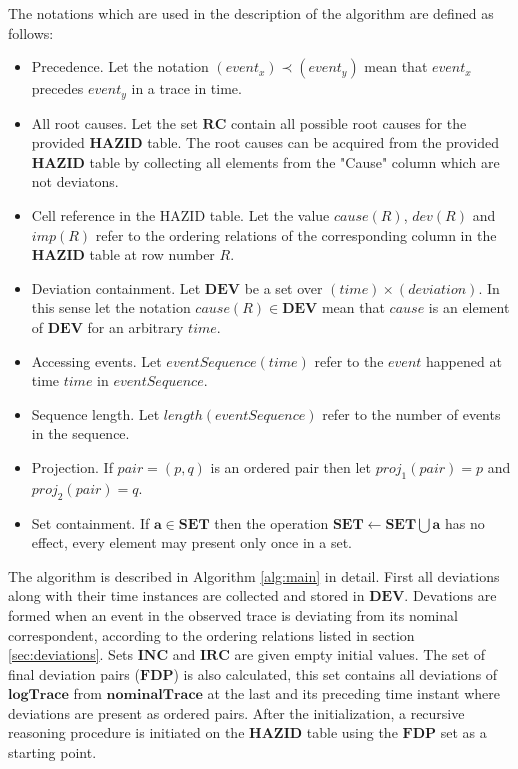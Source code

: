 \documentclass[conference]{IEEEtran}
\begin{document}
The notations which are used in the description of the algorithm are defined as follows:

\begin{itemize}
\item Precedence. Let the notation $(event_x) \prec (event_y)$ mean that $event_x$ precedes $event_y$ in a trace in time.
\item All root causes. Let the set $\mathbf{RC}$ contain all possible root causes for the provided $\mathbf{HAZID}$ table. The root causes can be acquired from the provided $\mathbf{HAZID}$ table by collecting all elements from the "Cause" column which are not deviatons.
\item Cell reference in the HAZID table. Let the value $cause(R)$, $dev(R)$ and $imp(R)$ refer to the ordering relations of the corresponding column
in the $\mathbf{HAZID}$ table at row number $R$.
\item Deviation containment. Let $\mathbf{DEV}$ be a set over $(time)\times(deviation)$. In this sense let the notation $cause(R) \in \mathbf{DEV}$ mean that $cause$ is an element of $\mathbf{DEV}$ for an arbitrary $time$.
\item Accessing events. Let $eventSequence(time)$ refer to the $event$ happened at time $time$ in $eventSequence$.
\item Sequence length. Let $length(eventSequence)$ refer to the number of events in the sequence.
\item Projection. If $pair = (p,q)$ is an ordered pair then let $proj_1(pair)=p$ and $proj_2(pair)=q$.
\item Set containment. If $\mathbf{a} \in \mathbf{SET}$ then the operation $\mathbf{SET} \leftarrow \mathbf{SET} \bigcup \mathbf{a}$ has no effect, every element may present only once in a set.
\end{itemize}

The algorithm is described in Algorithm \ref{alg:main} in detail. First all deviations along with their time instances are collected and stored in $\mathbf{DEV}$. Devations are formed when an event in the observed trace is deviating from its nominal correspondent, according to the ordering relations listed in section \ref{sec:deviations}. Sets $\mathbf{INC}$ and $\mathbf{IRC}$ are given empty initial values. The set of final deviation pairs ($\mathbf{FDP}$) is also calculated, this set contains all deviations of $\mathbf{logTrace}$ from $\mathbf{nominalTrace}$ at the last and its preceding time instant where deviations are present as ordered pairs. After the initialization, a recursive reasoning procedure is initiated on the $\mathbf{HAZID}$ table using the $\mathbf{FDP}$ set as a starting point.
\end{document}
